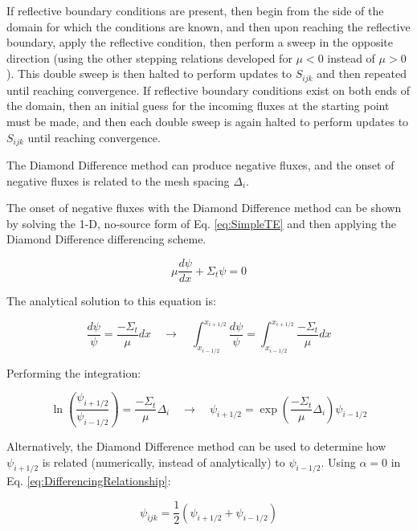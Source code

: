 \documentclass[10pt]{article}
\begin{document}
\begin{flushleft}
If reflective boundary conditions are present, then begin from the side of the domain for which the conditions are known, and then upon reaching the reflective boundary, apply the reflective condition, then perform a sweep in the opposite direction (using the other stepping relations developed for \(\mu<0\) instead of \(\mu>0\)). This double sweep is then halted to perform updates to \(S_{ijk}\) and then repeated until reaching convergence. If reflective boundary conditions exist on both ends of the domain, then an initial guess for the incoming fluxes at the starting point must be made, and then each double sweep is again halted to perform updates to \(S_{ijk}\) until reaching convergence. 

The Diamond Difference method can produce negative fluxes, and the onset of negative fluxes is related to the mesh spacing \(\Delta_i\). 

\begin{tcolorbox}[breakable]
The onset of negative fluxes with the Diamond Difference method can be shown by solving the 1-D, no-source form of Eq. \eqref{eq:SimpleTE} and then applying the Diamond Difference differencing scheme.

\begin{equation}
\label{eq:Ex2}
\mu\frac{d\psi}{dx}+\Sigma_t\psi=0
\end{equation}

The analytical solution to this equation is:

\begin{equation}
\frac{d\psi}{\psi}=\frac{-\Sigma_t}{\mu}dx\quad\rightarrow\quad\int_{x_{i-1/2}}^{x_{i+1/2}}\frac{d\psi}{\psi}=\int_{x_{i-1/2}}^{x_{i+1/2}}\frac{-\Sigma_t}{\mu}dx
\end{equation}

Performing the integration:

\begin{equation}
\label{eq:124}
\ln{\left(\frac{\psi_{i+1/2}}{\psi_{i-1/2}}\right)}=\frac{-\Sigma_t}{\mu}\Delta_i\quad\rightarrow\quad\psi_{i+1/2}=\exp{\left(\frac{-\Sigma_t}{\mu}\Delta_i\right)}\psi_{i-1/2}
\end{equation}

Alternatively, the Diamond Difference method can be used to determine how \(\psi_{i+1/2}\) is related (numerically, instead of analytically) to \(\psi_{i-1/2}\). Using \(\alpha=0\) in Eq. \eqref{eq:DifferencingRelationship}:

\begin{equation}
\label{eq:122}
\psi_{ijk}=\frac{1}{2}\left(\psi_{i+1/2}+\psi_{i-1/2}\right)
\end{equation}


\end{tcolorbox}
\end{flushleft}
\end{document}
